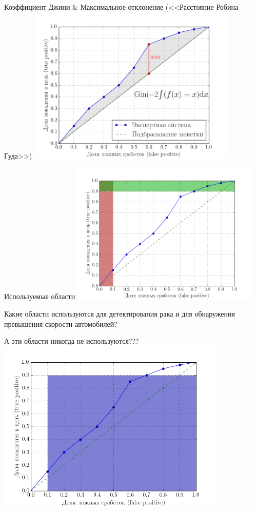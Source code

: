 \documentclass{beamer}
\begin{document}
  \begin{frame}{Коэффициент Джини \& Максимальное отклонение (<<Расстояние Робина Гуда>>)}
   \includegraphics[width=10cm]{../pic/gini_coef.png}
  \end{frame}

  \begin{frame}{Используемые области}
	\includegraphics[width=9cm]{../pic/roc_example_2.png}
   \small
   
	Какие области используются для детектирования рака 
	и для обнаружения превышения скорости
	автомобилей?
   \end{frame}


  \begin{frame}{А эти области никогда не используются???}
	\includegraphics[width=11cm]{../pic/roc_example_3.png}

  \end{frame}
\end{document}

